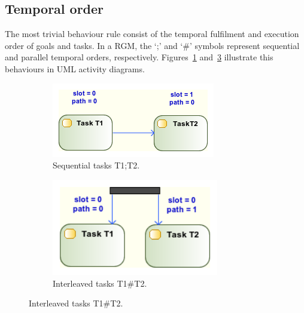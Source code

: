 \subsection{Temporal order}

The most trivial behaviour rule consist of the temporal fulfilment and execution order of goals and tasks. In a RGM, the `;' and `\#' symbols represent sequential and parallel temporal orders, respectively. Figures~\ref{fig:UML_SEQ_TSKS} and~\ref{fig:UML_PAR_TSKS} illustrate this behaviours in UML activity diagrams.

\begin{figure}[ht!]
        \centering
        \begin{subfigure}[b]{0.4\textwidth}
                \includegraphics[width=\textwidth]{imgs/UML_SEQ_TSKS.png}
				\caption{Sequential tasks T1;T2.}
				\label{fig:UML_SEQ_TSKS}
        \end{subfigure}        
        \quad %
        \begin{subfigure}[b]{0.4\textwidth}                
                \includegraphics[width=0.8\textwidth]{imgs/UML_PAR_TSKS.png}
				\caption{Interleaved tasks T1\#T2.}
				\label{fig:UML_PAR_TSKS}
        \end{subfigure}%
          
\end{figure}

